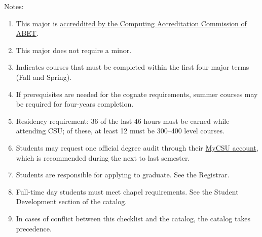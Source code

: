Notes:%
\begin{enumerate}\footnotesize
	\item This major is
		\href{https://www.abet.org/accreditation/what-is-accreditation/why-abet-accreditation-matters/}{accreddited by the Computing Accreditation Commission of ABET}.
	\item This major does not require a minor.
	\item\label{note:bs-cs:early-major-terms} Indicates courses that must be completed within the first four major terms (Fall and Spring).
	\item If prerequisites are needed for the cognate requirements, summer courses may be required for four-years completion.
	\item Residency requirement: 36 of the last 46 hours must be earned while attending CSU\@; of these, at least 12 must be 300--400 level courses.
	\item Students may request one official degree audit through their \href{https://portal.csuniv.edu/}{MyCSU account}, which is recommended during the next to last semester.
	\item Students are responsible for applying to graduate. See the Registrar.
	\item Full-time day students must meet chapel requirements. See the Student Development section of the catalog.
	\item In cases of conflict between this checklist and the catalog, the catalog takes precedence.
\end{enumerate}
